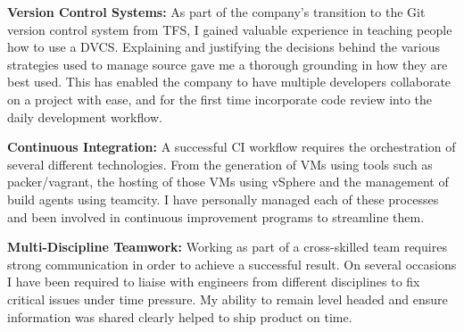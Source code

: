 \begin{cventries}
{\begin{cvitems}
        \item {\color{graytext}\textbf{Version Control Systems:} As part of the company's transition to the Git version control system from TFS, I gained valuable experience in teaching people how to use a DVCS. Explaining and justifying the decisions behind the various strategies used to manage source gave me a thorough grounding in how they are best used. This has enabled the company to have multiple developers collaborate on a project with ease, and for the first time incorporate code review into the daily development workflow. } 
        \item {\color{graytext}\textbf{Continuous Integration:} A successful CI workflow requires the orchestration of several different technologies. From the generation of VMs using tools such as packer/vagrant, the hosting of those VMs using vSphere and the management of build agents using teamcity. I have personally managed each of these processes and been involved in continuous improvement programs to streamline them. }
        \item {\color{graytext}\textbf{Multi-Discipline Teamwork:} Working as part of a cross-skilled team requires strong communication in order to achieve a successful result. On several occasions I have been required to liaise with engineers from different disciplines to fix critical issues under time pressure. My ability to remain level headed and ensure information was shared clearly helped to ship product on time. }
      \end{cvitems}
    }



\end{cventries}
